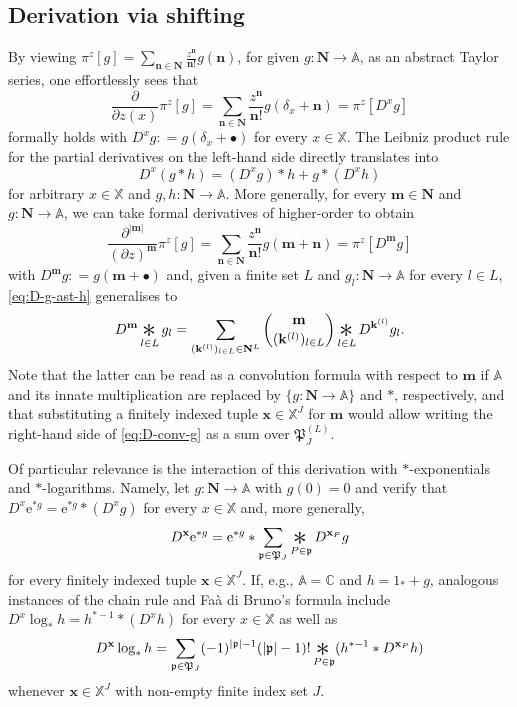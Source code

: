 \documentclass[10pt,a4paper]{amsart}
\newcommand{\e}{\mathrm{e}}
\newcommand{\C}{\mathbb{C}}
\newcommand{\X}{\mathbb X}
\newcommand{\A}{\mathbb A}
\newcommand{\be}{\begin{equation}}
\newcommand{\ee}{\end{equation}}
\newcommand{\Conv}{\mathop{\scalebox{2}{\raisebox{-0.275ex}{$\ast$}}}}
\begin{document}
\subsection{Derivation via shifting}

By viewing $\pi^z[g] = \sum_{\mathbf n \in \mathbf N} \frac{z^\mathbf n}{\mathbf n!} g(\mathbf n)$, for given $g : \mathbf N \to \A$, as an abstract Taylor series, one effortlessly sees that
\[
	\frac{\partial}{\partial z(x)} \pi^z[g] = \sum_{\mathbf n \in \mathbf N} \frac{z^\mathbf n}{\mathbf n!} g(\delta_x + \mathbf n) = \pi^z[D^x g]
\]
formally holds with $D^x g : = g(\delta_x + \bullet)$ for every $x \in \X$. 
The Leibniz product rule for the partial derivatives on the left-hand side directly translates into
\be \label{eq:D-g-ast-h}
	D^x (g \ast h) = (D^x g) \ast h + g \ast (D^x h)
\ee
for arbitrary $x \in \X$ and $g, h : \mathbf N \to \A$. 
More generally, for every $\mathbf m \in \mathbf N$ and $g : \mathbf N \to \A$, we can take formal derivatives of higher-order to obtain
\[
	\frac{\partial^{|\mathbf m|}}{(\partial z)^\mathbf m} \pi^z[g] = \sum_{\mathbf n \in \mathbf N} \frac{z^\mathbf n}{\mathbf n!} g(\mathbf m + \mathbf n) = \pi^z[D^\mathbf m g]
\]
with $D^\mathbf m g : = g(\mathbf m + \bullet)$ and, given a finite set $L$ and $g_l : \mathbf N \to \A$ for every $l \in L$, \eqref{eq:D-g-ast-h} generalises to
\be \label{eq:D-conv-g}
	D^\mathbf m \Conv_{l \in L} g_l = \sum_{(\mathbf k^{(l)})_{l \in L} \in \mathbf N^L} \binom{\mathbf m}{(\mathbf k^{(l)})_{l \in L}} \Conv_{l \in L} D^{\mathbf k^{(l)}} g_l.
\ee
Note that the latter can be read as a convolution formula with respect to $\mathbf m$ if $\A$ and its innate multiplication are replaced by $\{g : \mathbf N \to \A\}$ and $\ast$, respectively, and that substituting a finitely indexed tuple $\mathbf x \in \X^J$ for $\mathbf m$ would allow writing the right-hand side of \eqref{eq:D-conv-g} as a sum over $\mathfrak P_J^{(L)}$.

Of particular relevance is the interaction of this derivation with $\ast$-exponentials and $\ast$-logarithms. 
Namely, let $g : \mathbf N \to \A$ with $g(0) = 0$ and verify that $D^x \e^{\ast g} = \e^{\ast g} \ast (D^x g)$ for every $x \in \X$ and, more generally,
\be \label{eq:D-exp}
	D^\mathbf x \e^{\ast g} = \e^{\ast g} \ast \sum_{\mathfrak p \in \mathfrak P_J} \Conv_{P \in \mathfrak p} D^{\mathbf x_P} g
\ee
for every finitely indexed tuple $\mathbf x \in \X^J$. 
If, e.g., $\A = \C$ and $h = 1_\ast + g$, analogous instances of the chain rule and Fa\`a di Bruno's formula include $D^x \log_\ast h = h^{\ast -1} \ast (D^x h)$ for every $x \in \X$ as well as
\begin{equation} \label{eq:D-log}
	D^\mathbf x \log_\ast h = \sum_{\mathfrak p \in \mathfrak P_J} (-1)^{|\mathfrak p| - 1} (|\mathfrak p| - 1)! \Conv_{P \in \mathfrak p} (h^{\ast -1} \ast D^{\mathbf x_P} h)
\end{equation}
whenever $\mathbf x \in \X^J$ with non-empty finite index set $J$.
\end{document}
